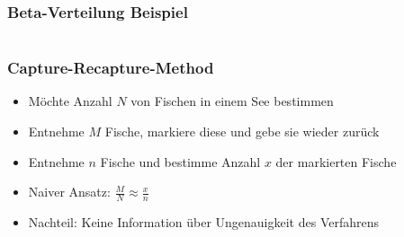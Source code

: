 \documentclass[aspectratio=169,xcolor=dvipsnames]{beamer}
\begin{document}
\begin{frame}
\frametitle{Beta-Verteilung Beispiel}
\begin{columns}
\end{columns}
\end{frame}

\begin{frame}
\frametitle{Capture-Recapture-Method}
\begin{itemize}
	\item<1-> Möchte Anzahl $N$ von Fischen in einem See bestimmen
	\item<2-> Entnehme $M$ Fische, markiere diese und gebe sie wieder zurück
	\item<3-> Entnehme $n$ Fische und bestimme Anzahl $x$ der markierten Fische
	\item<4-> Naiver Ansatz: $\frac{M}{N}\approx \frac{x}{n}$
	\item<5-> Nachteil: Keine Information über Ungenauigkeit des Verfahrens
\end{itemize}
\end{frame}
\end{document}
